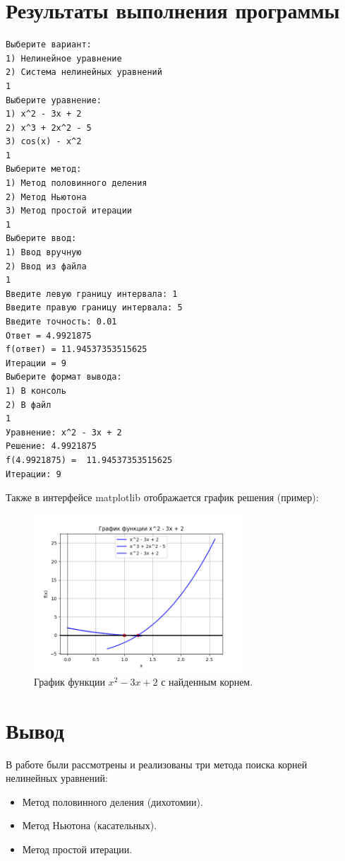 \documentclass[a4paper,12pt]{article}
\begin{document}
\section{Результаты выполнения программы}
\begin{verbatim}
Выберите вариант:
1) Нелинейное уравнение
2) Система нелинейных уравнений
1
Выберите уравнение:
1) x^2 - 3x + 2 
2) x^3 + 2x^2 - 5
3) cos(x) - x^2
1
Выберите метод:
1) Метод половинного деления
2) Метод Ньютона
3) Метод простой итерации
1
Выберите ввод:
1) Ввод вручную 
2) Ввод из файла
1
Введите левую границу интервала: 1
Введите правую границу интервала: 5
Введите точность: 0.01     
Ответ = 4.9921875
f(ответ) = 11.94537353515625
Итерации = 9
Выберите формат вывода:
1) В консоль
2) В файл
1
Уравнение: x^2 - 3x + 2  
Решение: 4.9921875 
f(4.9921875) =  11.94537353515625 
Итерации: 9
\end{verbatim}

Также в интерфейсе matplotlib отображается график решения (пример):

\begin{figure}[h!]
  \centering
  \includegraphics[width=0.7\textwidth]{fig3.png}
  \caption{График функции $x^2 - 3x + 2$ с найденным корнем.}
\end{figure}

\section{Вывод}
В работе были рассмотрены и реализованы три метода поиска корней нелинейных уравнений:
\begin{itemize}
  \item Метод половинного деления (дихотомии).
  \item Метод Ньютона (касательных).
  \item Метод простой итерации.
\end{itemize}
\end{document}
